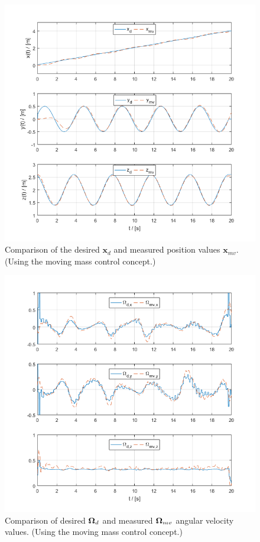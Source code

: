 \begin{figure}[h!]
	\centering
	\includegraphics[width=\columnwidth]{./pictures/mmc_traj_pos.png}
	\caption{Comparison of the desired $\textbf{x}_d$ and measured position values $\textbf{x}_{mv}$. (Using the moving mass control concept.)}
	\label{fig:traj_pos}
\end{figure}

\begin{figure}[h!]
	\centering
	\includegraphics[width=\columnwidth]{./pictures/mmc_traj_omega.png}
	\caption{Comparison of desired $\boldsymbol{\Omega}_d$ and measured $\boldsymbol{\Omega}_{mv}$ angular velocity values. (Using the moving mass control concept.)}
	\label{fig:traj_omega}
\end{figure}

